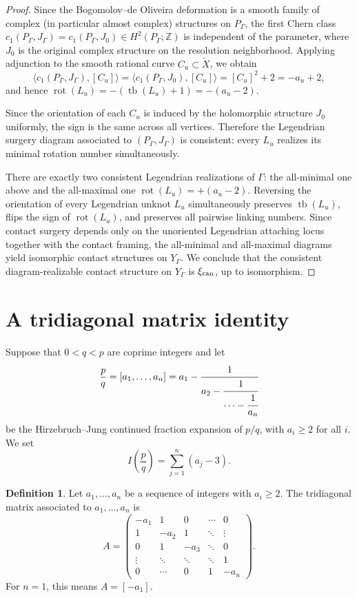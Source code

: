 \documentclass[11pt]{amsart}
\theoremstyle{plain}
\theoremstyle{definition}
\newtheorem{definition}[theorem]{Definition}
\theoremstyle{remark}
\newcommand{\Z}{\mathbb{Z}}
\DeclareMathOperator\tb{tb}
\DeclareMathOperator\rot{rot}
\begin{document}
\begin{proof}
Since the Bogomolov--de Oliveira deformation is a smooth family of
complex (in particular almost complex) structures on $P_\Gamma$, the
first Chern class
$c_1(P_\Gamma,J_\Gamma)=c_1(P_\Gamma,J_0)\in H^2(P_\Gamma;\Z)$ is
independent of the parameter, where $J_0$ is the original complex
structure on the resolution neighborhood. Applying adjunction to the
smooth rational curve $C_u\subset\tilde X$, we obtain
\[
\langle c_1(P_\Gamma,J_\Gamma),[C_u]\rangle
=\langle c_1(P_\Gamma,J_0),[C_u]\rangle
=[C_u]^2+2=-a_u+2,
\]
and hence $\rot(L_u)=-(\tb(L_u)+1)=-(a_u-2)$.

Since the orientation of each $C_u$ is induced by the holomorphic
structure $J_0$ uniformly, the sign is the same across all vertices.
Therefore the Legendrian surgery diagram associated to
$(P_\Gamma,J_\Gamma)$ is consistent: every $L_u$ realizes its minimal
rotation number simultaneously.

There are exactly two consistent Legendrian realizations of $\Gamma$:
the all-minimal one above and the all-maximal one
$\rot(L_u)=+(a_u-2)$. Reversing the orientation of every Legendrian
unknot $L_u$ simultaneously preserves $\tb(L_u)$, flips the sign of
$\rot(L_u)$, and preserves all pairwise linking numbers. Since
contact surgery depends only on the unoriented Legendrian attaching
locus together with the contact framing, the all-minimal and
all-maximal diagrams yield isomorphic contact structures on
$Y_\Gamma$. We conclude that the consistent diagram-realizable
contact structure on $Y_\Gamma$ is $\xi_{\rm can}$, up to
isomorphism.
\end{proof}

\section{A tridiagonal matrix identity}\label{sec:local}

Suppose that $0<q<p$ are coprime integers and let
\[
\frac pq=[a_1,\dots,a_n]
=
a_1-\cfrac{1}{a_2-\cfrac{1}{\cdots-\cfrac{1}{a_n}}}
\]
be the Hirzebruch--Jung continued fraction expansion of $p/q$, with
$a_i\ge 2$ for all $i$. We set
\[
I\!\left(\frac pq\right)=\sum_{j=1}^n(a_j-3).
\]

\begin{definition}
Let $a_1,\ldots,a_n$ be a sequence of integers with $a_i\ge 2$. The
tridiagonal matrix associated to $a_1,\ldots,a_n$ is
\[
A=
\begin{pmatrix}
-a_1 & 1 & 0 & \cdots & 0\\
1 & -a_2 & 1 & \ddots & \vdots\\
0 & 1 & -a_3 & \ddots & 0\\
\vdots & \ddots & \ddots & \ddots & 1\\
0 & \cdots & 0 & 1 & -a_n
\end{pmatrix}.
\]
For $n=1$, this means $A=[-a_1]$.
\end{definition}
\end{document}
